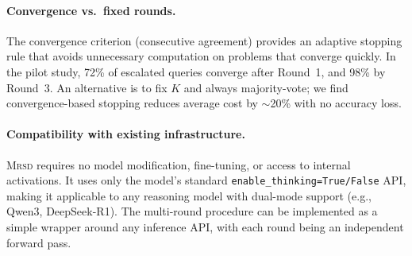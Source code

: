 \paragraph{Convergence vs.\ fixed rounds.}
The convergence criterion (consecutive agreement) provides an adaptive
stopping rule that avoids unnecessary computation on problems that
converge quickly.
In the pilot study, 72\% of escalated queries converge after Round~1,
and 98\% by Round~3.
An alternative is to fix $K$ and always majority-vote; we find
convergence-based stopping reduces average cost by ${\sim}$20\% with
no accuracy loss.

\paragraph{Compatibility with existing infrastructure.}
\textsc{Mrsd} requires no model modification, fine-tuning, or access
to internal activations.
It uses only the model's standard
\texttt{enable\_thinking=True/False} API, making it applicable to any
reasoning model with dual-mode support (e.g., Qwen3, DeepSeek-R1).
The multi-round procedure can be implemented as a simple wrapper around
any inference API, with each round being an independent forward pass.
